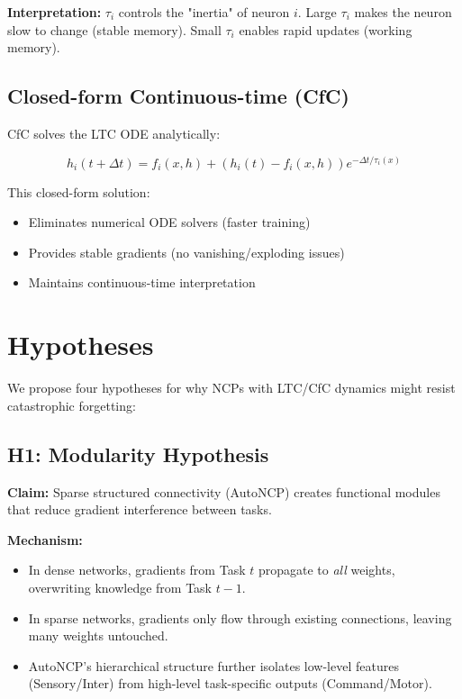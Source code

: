 \documentclass[11pt,twocolumn]{article}
\begin{document}
\textbf{Interpretation:} $\tau_i$ controls the "inertia" of neuron $i$. Large $\tau_i$ makes the neuron slow to change (stable memory). Small $\tau_i$ enables rapid updates (working memory).

\subsection{Closed-form Continuous-time (CfC)}

CfC \cite{hasani2022closed} solves the LTC ODE analytically:

\begin{equation}
    h_i(t + \Delta t) = f_i(x, h) + (h_i(t) - f_i(x, h)) e^{-\Delta t / \tau_i(x)}
\end{equation}

This closed-form solution:
\begin{itemize}
    \item Eliminates numerical ODE solvers (faster training)
    \item Provides stable gradients (no vanishing/exploding issues)
    \item Maintains continuous-time interpretation
\end{itemize}

\section{Hypotheses}

We propose four hypotheses for why NCPs with LTC/CfC dynamics might resist catastrophic forgetting:

\subsection{H1: Modularity Hypothesis}

\textbf{Claim:} Sparse structured connectivity (AutoNCP) creates functional modules that reduce gradient interference between tasks.

\textbf{Mechanism:}
\begin{itemize}
    \item In dense networks, gradients from Task $t$ propagate to \textit{all} weights, overwriting knowledge from Task $t-1$.
    \item In sparse networks, gradients only flow through existing connections, leaving many weights untouched.
    \item AutoNCP's hierarchical structure further isolates low-level features (Sensory/Inter) from high-level task-specific outputs (Command/Motor).
\end{itemize}
\end{document}
